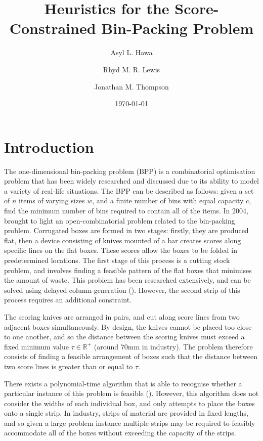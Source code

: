 \documentclass[oribibl]{llncs}
\title{Heuristics for the Score-Constrained Bin-Packing Problem}
\author{Asyl L. Hawa \and Rhyd M. R. Lewis \and Jonathan M. Thompson}
\institute{School of Mathematics, Cardiff University, Senghennydd Road, Cardiff, UK, CF24 4AG}
\date{\today}
\begin{document}
\maketitle

\begin{abstract}
	
\end{abstract}

\section{Introduction}

The one-dimensional bin-packing problem (BPP) is a combinatorial optimisation problem that has been widely researched and discussed due to its ability to model a variety of real-life situations. The BPP can be described as follows: given a set of $n$ items of varying sizes $w$, and a finite number of bins with equal capacity $c$, find the minimum number of bins required to contain all of the items. In 2004, \citeauthor{goulimis2004} brought to light an open-combinatorial problem related to the bin-packing problem. Corrugated boxes are formed in two stages: firstly, they are produced flat, then a device consisting of knives mounted of a bar creates scores along specific lines on the flat boxes. These scores allow the boxes to be folded in predetermined locations. The first stage of this process is a cutting stock problem, and involves finding a feasible pattern of the flat boxes that minimises the amount of waste. This problem has been researched extensively, and can be solved using delayed column-generation (\citealp{gilmore1961, gilmore1963}). However, the second strip of this process requires an additional constraint.

The scoring knives are arranged in pairs, and cut along score lines from two adjacent boxes simultaneously. By design, the knives cannot be placed too close to one another, and so the distance between the scoring knives must exceed a fixed minimum value $\tau \in \mathbb{R}^{+}$ (around 70mm in industry). The problem therefore consists of finding a feasible arrangement of boxes such that the distance between two score lines is greater than or equal to $\tau$.

There exists a polynomial-time algorithm that is able to recognise whether a particular instance of this problem is feasible (\citealp{becker2010}). However, this algorithm does not consider the widths of each individual box, and only attempts to place the boxes onto a single strip. In industry, strips of material are provided in fixed lengths, and so given a large problem instance multiple strips may be required to feasibly accommodate all of the boxes without exceeding the capacity of the strips.  
\end{document}
